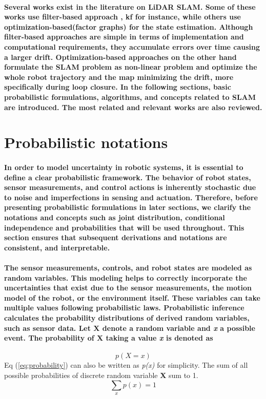 \paragraph{\textnormal{Several works exist in the literature on LiDAR SLAM\cite{zhang2024lidar}. Some of these works use filter-based approach \cite{smith1986representation, dissanayake2001solution}, \gls{kf} for instance, while others use optimization-based(factor graphs)\cite{kuemmerle2011g2o, kummerle2009large} for the state estimation. Although filter-based approaches are simple in terms of implementation and computational requirements, they accumulate errors over time causing a larger drift. Optimization-based approaches on the other hand formulate the SLAM problem as non-linear problem and optimize the whole robot trajectory and the map minimizing the drift, more specifically during loop closure. In the following sections, basic probabilistic formulations, algorithms, and concepts related to SLAM are introduced. The most related and relevant works are also reviewed.}}

\section{Probabilistic notations}

\paragraph{{\textnormal{In order to model uncertainty in robotic systems, it is essential to define a clear probabilistic framework. The behavior of robot states, sensor measurements, and control actions is inherently stochastic due to noise and imperfections in sensing and actuation. Therefore, before presenting probabilistic formulations in later sections, we clarify the notations and concepts such as joint distribution,  conditional independence and probabilities that will be used throughout. This section ensures that subsequent derivations and notations are consistent, and interpretable.
}}}
\paragraph{\textnormal{The sensor measurements, controls, and robot states are modeled as random variables. This modeling helps to correctly incorporate the uncertainties that exist due to the sensor measurements, the motion model of the robot, or the environment itself\cite{thrun2002probabilistic}. These variables can take multiple values following probabilistic laws. Probabilistic inference calculates the probability distributions of derived random variables, such as sensor data. Let \textbf{X} denote a random variable and \textit{x} a possible event. The probability of \textbf{X} taking a value \textit{x} is denoted as
}}
\begin{equation} p(X = x) \label{eq:probability}\end{equation}
Eq (\ref{eq:probability}) can also be written as \textit{p(x)} for simplicity. The sum of all possible probabilities of discrete random variable \textbf{X} sum to 1.
\begin{equation} \sum_x p(x) = 1 \label{eq:pro_sum}\end{equation}


